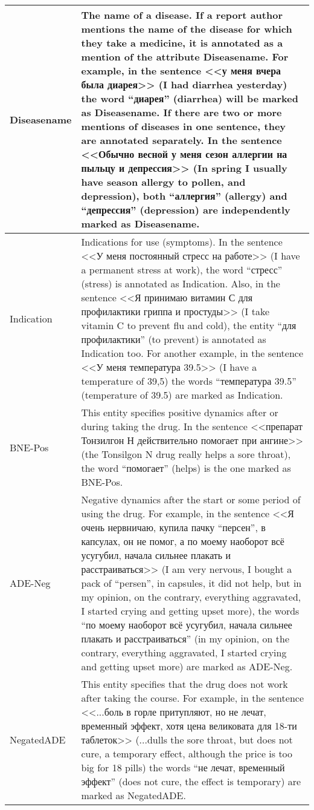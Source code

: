 \begin{tabular}{|p{}|p{}|}
\hline
Diseasename & The name of a disease. If a report author mentions the name of the disease for which they take a medicine, it is annotated as a mention of the attribute Diseasename. For example, in the sentence <<у меня вчера была диарея>> (I had diarrhea yesterday) the word ``диарея'' (diarrhea) will be marked as Diseasename. If there are two or more mentions of diseases in one sentence, they are annotated separately. In the sentence <<Обычно весной у меня сезон аллергии на пыльцу и депрессия>> (In spring I usually have season allergy to pollen, and depression), both ``аллергия'' (allergy) and ``депрессия'' (depression) are independently marked as Diseasename.
\\ \hline
Indication  & Indications for use (symptoms). In the sentence <<У меня постоянный стресс на работе>> (I have a permanent stress at work), the word ``стресс'' (stress) is annotated as Indication. Also, in the sentence <<Я принимаю витамин С для профилактики гриппа и простуды>> (I take vitamin C to prevent flu and cold), the entity ``для профилактики'' (to prevent) is annotated as Indication too. For another example, in the sentence <<У меня температура 39.5>> (I have a temperature of 39,5) the words ``температура 39.5'' (temperature of 39.5) are marked as Indication.
\\ \hline
BNE-Pos     & This entity specifies positive dynamics after or during taking the drug. In the sentence <<препарат Тонзилгон Н действительно помогает при ангине>> (the Tonsilgon N drug really helps a sore throat), the word ``помогает'' (helps) is the one marked as BNE-Pos.
\\ \hline
ADE-Neg     & Negative dynamics after the start or some period of using the drug. For example, in the sentence <<Я очень нервничаю, купила пачку ``персен'', в капсулах, он не помог, а по моему наоборот всё усугубил, начала сильнее плакать и расстраиваться>> (I am very nervous, I bought a pack of ``persen'', in capsules, it did not help, but in my opinion, on the contrary, everything aggravated, I started crying and getting upset more), the words ``по моему наоборот всё усугубил, начала сильнее плакать и расстраиваться'' (in my opinion, on the contrary, everything aggravated, I started crying and getting upset more) are marked as ADE-Neg.                                                                                      \\ \hline
NegatedADE  & This entity specifies that the drug does not work after taking the course. For example, in the sentence <<...боль в горле притупляют, но не лечат, временный эффект, хотя цена великовата для 18-ти таблеток>> (...dulls the sore throat, but does not cure, a temporary effect, although the price is too big for 18 pills) the words ``не лечат, временный эффект'' (does not cure, the effect is temporary) are marked as NegatedADE.                                                                                                                                                                                                                                                                                                     \\ \hline

\end{tabular}
